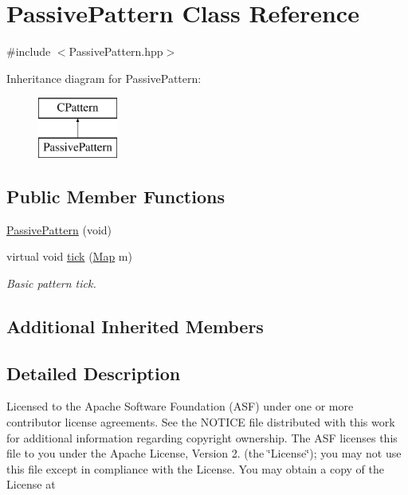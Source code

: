 \hypertarget{class_passive_pattern}{\section{Passive\+Pattern Class Reference}
\label{class_passive_pattern}
}


{\ttfamily \#include $<$Passive\+Pattern.\+hpp$>$}

Inheritance diagram for Passive\+Pattern\+:\begin{figure}[H]
\begin{center}
\leavevmode
\includegraphics[height=2.000000cm]{class_passive_pattern}
\end{center}
\end{figure}
\subsection*{Public Member Functions}
\begin{DoxyCompactItemize}
\item 
\hyperlink{class_passive_pattern_adea96f0834e7c34c98d6a3b85c818501}{Passive\+Pattern} (void)
\item 
virtual void \hyperlink{class_passive_pattern_ac108c099eeb758e4944c4e7c4187682d}{tick} (\hyperlink{class_map}{Map} m)
\begin{DoxyCompactList}\small\item\em Basic pattern tick. \end{DoxyCompactList}\end{DoxyCompactItemize}
\subsection*{Additional Inherited Members}


\subsection{Detailed Description}
Licensed to the Apache Software Foundation (A\+S\+F) under one or more contributor license agreements. See the N\+O\+T\+I\+C\+E file distributed with this work for additional information regarding copyright ownership. The A\+S\+F licenses this file to you under the Apache License, Version 2. (the \char`\"{}\+License\char`\"{}); you may not use this file except in compliance with the License. You may obtain a copy of the License at

